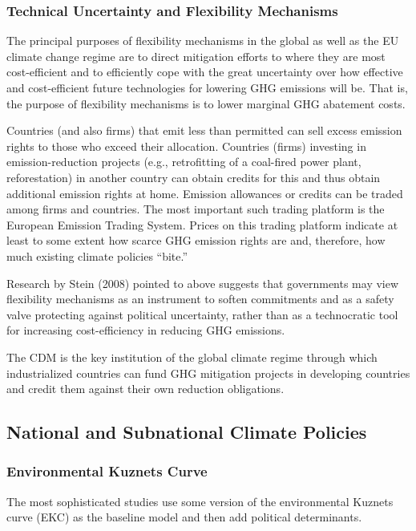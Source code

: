 \subsubsection{Technical Uncertainty and Flexibility Mechanisms}

The principal purposes of flexibility mechanisms in the global as well as the EU climate change regime are to direct mitigation efforts to where they are most cost-efficient and to efficiently cope with the great uncertainty over how effective and cost-efficient future technologies for lowering GHG emissions will be. That is, the purpose of flexibility mechanisms is to lower marginal GHG abatement costs.

Countries (and also firms) that emit less than permitted can sell excess emission rights to those who exceed their allocation. Countries (firms) investing in emission-reduction projects (e.g., retrofitting of a coal-fired power plant, reforestation) in another country can obtain credits for this and thus obtain additional emission rights at home. Emission allowances or credits can be traded among firms and countries. The most important such trading platform is the European Emission Trading System. Prices on this trading platform indicate at least to some extent how scarce GHG emission rights are and, therefore, how much existing climate policies “bite.”

Research by Stein (2008) pointed to above suggests that governments may view flexibility mechanisms as an instrument to soften commitments and as a safety valve protecting against political uncertainty, rather than as a technocratic tool for increasing cost-efficiency in reducing GHG emissions.

The CDM is the key institution of the global climate regime through which industrialized countries can fund GHG mitigation projects in developing countries and credit them against their own reduction obligations.

\subsection{National and Subnational Climate Policies}

\subsubsection{Environmental Kuznets Curve}
The most sophisticated studies use some version of the environmental Kuznets curve (EKC) as the baseline model and then add political determinants.


